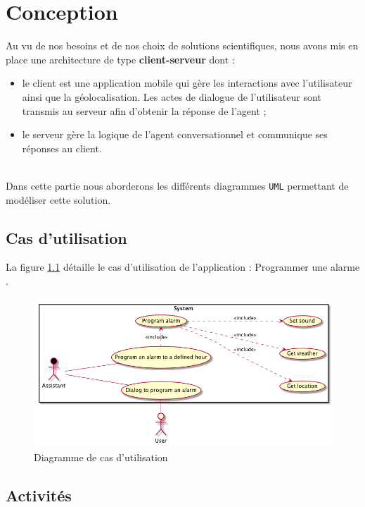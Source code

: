 \chapter{Conception}

Au vu de nos besoins et de nos choix de solutions scientifiques, nous avons mis en place une architecture de type
\textbf{client-serveur} dont :
\begin{itemize}
    \item le client est une application mobile qui gère les interactions avec l'utilisateur ainsi que la géolocalisation. Les actes de dialogue de l'utilisateur sont transmis au serveur afin d'obtenir la réponse de l'agent ;
    \item le serveur gère la logique de l'agent conversationnel et communique ses réponses au client.
\end{itemize}

~\\\indent
Dans cette partie nous aborderons les différents diagrammes \texttt{UML} permettant de modéliser cette solution.


\section{Cas d'utilisation}

La figure \ref{usecase-diagram} détaille le cas d'utilisation de l'application : \og Programmer une alarme \fg.

\begin{figure}[!h]
    \centering
    \includegraphics[width=\textwidth]{../docs/conception/build/usecaseDiagram.png}
    \caption{Diagramme de cas d'utilisation}
    \label{usecase-diagram}
\end{figure}


\section{Activités}

